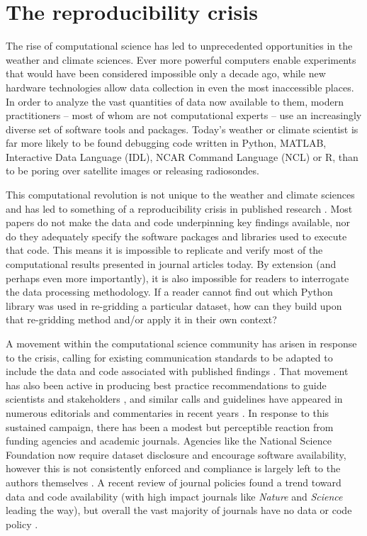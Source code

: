 \section{The reproducibility crisis}

The rise of computational science has led to unprecedented opportunities in the weather and climate sciences. Ever more powerful computers enable experiments that would have been considered impossible only a decade ago, while new hardware technologies allow data collection in even the most inaccessible places. In order to analyze the vast quantities of data now available to them, modern practitioners – most of whom are not computational experts – use an increasingly diverse set of software tools and packages. Today's weather or climate scientist is far more likely to be found debugging code written in Python, MATLAB, Interactive Data Language (IDL), NCAR Command Language (NCL) or R, than to be poring over satellite images or releasing radiosondes. 

This computational revolution is not unique to the weather and climate sciences and has led to something of a reproducibility crisis in published research \citep[e.g.][]{Peng2011}. Most papers do not make the data and code underpinning key findings available, nor do they adequately specify the software packages and libraries used to execute that code. This means it is impossible to replicate and verify most of the computational results presented in journal articles today. By extension (and perhaps even more importantly), it is also impossible for readers to interrogate the data processing methodology. If a reader cannot find out which Python library was used in re-gridding a particular dataset, how can they build upon that re-gridding method and/or apply it in their own context? 

A movement within the computational science community has arisen in response to the crisis, calling for existing communication standards to be adapted to include the data and code associated with published findings \citep[e.g.][]{Stodden2014}. That movement has also been active in producing best practice recommendations to guide scientists and stakeholders \citep[e.g.][]{Prlic2012,Sandve2013,Stodden2012a,Stodden2014}, and similar calls and guidelines have appeared in numerous editorials and commentaries in recent years \citep[e.g.][]{Barnes2010,Ince2012,Merali2010}. In response to this sustained campaign, there has been a modest but perceptible reaction from funding agencies and academic journals. Agencies like the National Science Foundation now require dataset disclosure and encourage software availability, however this is not consistently enforced and compliance is largely left to the authors themselves \citep{Stodden2013}. A recent review of journal policies found a trend toward data and code availability (with high impact journals like \textit{Nature} and \textit{Science} leading the way), but overall the vast majority of journals have no data or code policy \citep{Stodden2013}. 

